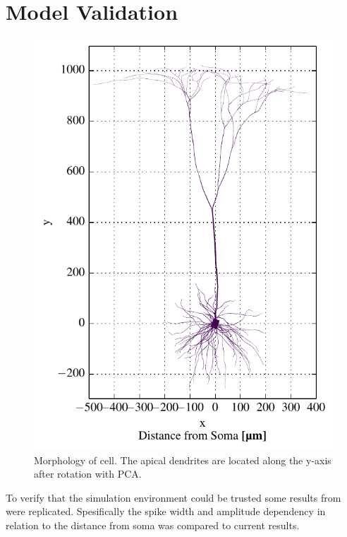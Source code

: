 \documentclass[altfont, fleqn]{uiophd}
\begin{document}
\vspace{1em} 
\startcontents
{}

\section{Model Validation}
\begin{figure}
    \vspace{-20pt}
    \begin{center}
        \includegraphics[width=\linewidth]{images/4_1/morph_xy_up.pdf}
        \vspace{-20pt}
        \caption{%
            Morphology of \textcite{mainen_influence_1996} cell. 
            The apical dendrites are located along the y-axis after rotation
            with PCA.}
        \label{fig:4_1_morph}
        \vspace{-10pt}
    \end{center}
\end{figure}
%
To verify that the simulation environment could be trusted 
some results from 
\textcite{pettersen_amplitude_2008} were replicated.
Spesifically the spike width and amplitude dependency in relation to 
the distance from soma was compared to current results. 
\end{document}
